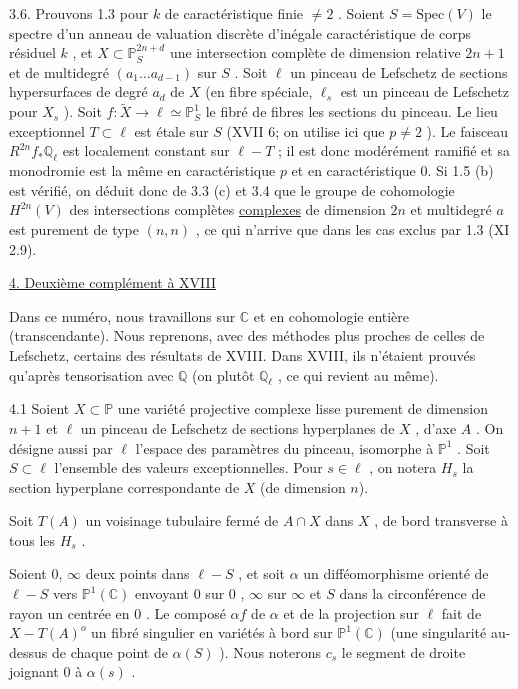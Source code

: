 3.6. \quad Prouvons 1.3 pour $k$ de caractéristique finie $\neq 2$ . Soient $S = \mathrm{Spec}(V)$ le spectre d'un anneau de valuation discrète d'inégale caractéristique de corps résiduel $k$ , et $X \subset \mathbb{P}^{2n+d}_S$ une intersection complète de dimension relative $2n+1$ et de multidegré $(a_1 \ldots a_{d-1})$ sur $S$ . Soit $\ell$ un pinceau de Lefschetz de sections hypersurfaces de degré $a_d$ de $X$ (en fibre spéciale, $\ell_s$ est un pinceau de Lefschetz pour $X_s$ ). Soit $f : \widetilde{X} \longrightarrow \ell \simeq \mathbb{P}^1_S$ le fibré de fibres les sections du pinceau. Le lieu exceptionnel $T \subset \ell$ est étale sur $S$ (XVII 6; on utilise ici que $p \neq 2$ ). Le faisceau $R^{2n} f_* \mathbb{Q}_\ell$ est localement constant sur $\ell - T$ ; il est donc modérément ramifié et sa monodromie est la même en caractéristique $p$ et en caractéristique $0$. Si 1.5 (b) est vérifié, on déduit donc de 3.3 (c) et 3.4 que le groupe de cohomologie $H^{2n}(V)$ des intersections complètes \underline{complexes} de dimension $2n$ et multidegré \underline{$a$} est purement de type $(n, n)$ , ce qui n'arrive que dans les cas exclus par 1.3 (XI 2.9).


\underline{4. Deuxième complément à XVIII}

Dans ce numéro, nous travaillons sur $\mathbb{C}$ et en cohomologie entière (transcendante). Nous reprenons, avec des méthodes plus proches de celles de Lefschetz, certains des résultats de XVIII. Dans XVIII, ils n'étaient prouvés qu'après tensorisation avec $\mathbb{Q}$ (on plutôt $\mathbb{Q}_\ell$ , ce qui revient au même).

4.1 \quad Soient $X \subset \mathbb{P}$ une variété projective complexe lisse purement de dimension $n + 1$ et $\ell$ un pinceau de Lefschetz de sections hyperplanes de $X$ , d'axe $A$ . On désigne aussi par $\ell$ l'espace des paramètres du pinceau, isomorphe à $\mathbb{P}^1$ . Soit $S \subset \ell$ l'ensemble des valeurs exceptionnelles. Pour $s \in \ell$ , on notera $H_s$ la section hyperplane correspondante de $X$ (de dimension $n$).



Soit $T(A)$ un voisinage tubulaire fermé de $A \cap X$ dans $X$ , de bord transverse à tous les $H_s$ .

Soient $0$, $\infty$ deux points dans $\ell - S$ , et soit $\alpha$ un difféomorphisme orienté de $\ell - S$ vers $\mathbb{P}^1(\mathbb{C})$ envoyant $0$ sur $0$ , $\infty$ sur $\infty$ et $S$ dans la circonférence de rayon un centrée en $0$ . Le composé $\alpha f$ de $\alpha$ et de la projection sur $\ell$ fait de $X - T(A)^o$ un fibré singulier en variétés à bord sur $\mathbb{P}^1(\mathbb{C})$ (une singularité au-dessus de chaque point de $\alpha(S)$ ). Nous noterons $c_s$ le segment de droite joignant $0$ à $\alpha(s)$ .

